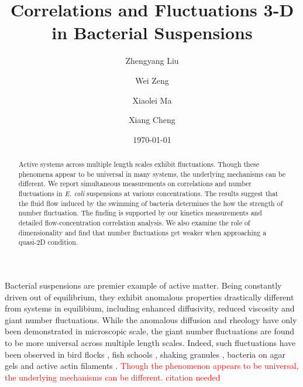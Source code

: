 \documentclass[twocolumn,aps,prl,amsmath,amssymb,longbibliography]{revtex4-2}
\begin{document}
\title{Correlations and Fluctuations 3-D in Bacterial Suspensions}

\author{Zhengyang Liu}
\author{Wei Zeng}
\author{Xiaolei Ma}
\author{Xiang Cheng}



\date{\today}


\begin{abstract}
Active systems across multiple length scales exhibit  fluctuations. Though these phenomena appear to be universal in many systems, the underlying mechanisms can be different. We report simultaneous measurements on correlations and number fluctuations in \textit{E. coli} suspensions at various concentrations. The results suggest that the fluid flow induced by the swimming of bacteria determines the how the strength of number fluctuation. The finding is supported by our kinetics measurements and detailed flow-concentration correlation analysis. We also examine the role of dimensionality and find that number fluctuations get weaker when approaching a quasi-2D condition.
\end{abstract}

\maketitle

Bacterial suspensions are premier example of active matter. Being constantly driven out of equilibrium, they exhibit anomalous properties drastically different from systems in equilibium, including enhanced diffusivity, reduced viscosity and giant number fluctuations. While the anomalous diffusion and rheology have only been demonstrated in microscopic scale, the giant number fluctuations are found to be more universal across multiple length scales. Indeed, such fluctuations have been observed in bird flocks \cite{Ballerini1232}, fish schools \cite{Ward6948}, shaking granules \cite{Narayan105}, bacteria on agar gels \cite{Zhang13626} and active actin filaments \cite{Schaller4488}. \textcolor{red}{Though the phenomenon appears to be universal, the underlying mechanisms can be different. citation needed}
\end{document}
